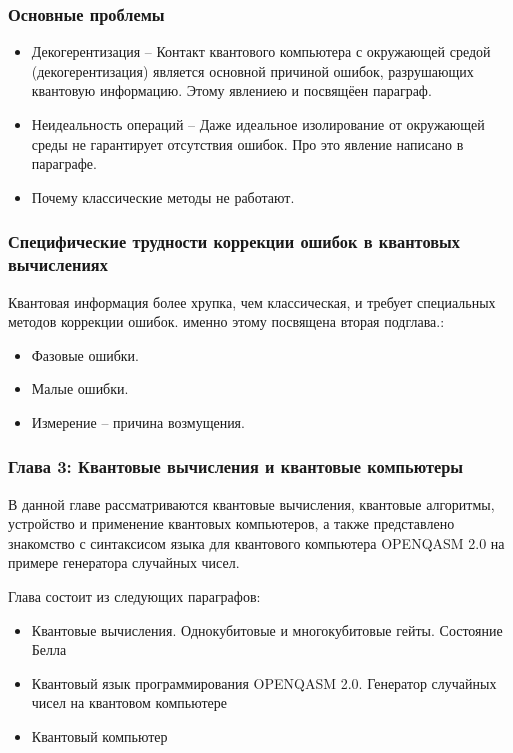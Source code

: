 \documentclass{beamer}
\begin{document}
	\begin{frame}\frametitle{Основные проблемы}
		
		\begin{itemize}
			\item \justifying Декогерентизация -- 	Контакт квантового компьютера с окружающей средой (декогерентизация) является основной причиной ошибок, разрушающих квантовую информацию. Этому явлениею и посвящёен параграф.
			\item \justifying Неидеальность операций -- Даже идеальное изолирование от окружающей среды не гарантирует отсутствия ошибок. Про это явление написано в параграфе.
			\item \justifying Почему классические методы не работают.
			
		\end{itemize}
		
	\end{frame}
	
	\begin{frame}\frametitle{Специфические трудности коррекции ошибок в квантовых вычислениях}
		\justifying
		Квантовая информация более хрупка, чем классическая, и требует специальных методов коррекции ошибок. именно этому  посвящена вторая подглава.:
		\begin{itemize}
			\item \justifying Фазовые ошибки.
			\item \justifying Малые ошибки.
			\item \justifying Измерение – причина возмущения.
			
		\end{itemize}
		
	\end{frame}
	
	\begin{frame}
		\frametitle{Глава 3: Квантовые вычисления и квантовые компьютеры}
		\justifying В данной главе рассматриваются квантовые вычисления, квантовые алгоритмы, устройство и применение квантовых компьютеров, а также представлено знакомство с синтаксисом языка для квантового компьютера OPENQASM 2.0 на примере генератора случайных чисел.
		
		Глава состоит из следующих параграфов:
		\begin{itemize}
			\item \justifying Квантовые вычисления. Однокубитовые и многокубитовые гейты. Состояние Белла
			\item \justifying Квантовый язык программирования OPENQASM 2.0. Генератор случайных чисел на квантовом компьютере
			\item \justifying Квантовый компьютер
		\end{itemize}
	\end{frame}
	
\end{document}
